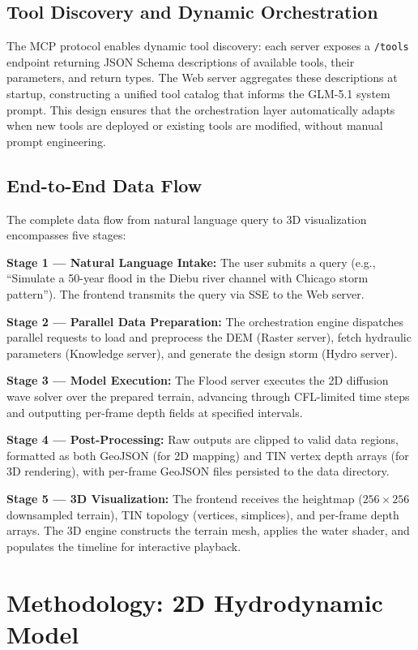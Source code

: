 \documentclass[11pt, a4paper]{article}
\begin{document}
\subsection{Tool Discovery and Dynamic Orchestration}

The MCP protocol enables dynamic tool discovery: each server exposes a \texttt{/tools} endpoint returning JSON Schema descriptions of available tools, their parameters, and return types. The Web server aggregates these descriptions at startup, constructing a unified tool catalog that informs the GLM-5.1 system prompt. This design ensures that the orchestration layer automatically adapts when new tools are deployed or existing tools are modified, without manual prompt engineering.

\subsection{End-to-End Data Flow}

The complete data flow from natural language query to 3D visualization encompasses five stages:

\textbf{Stage 1 --- Natural Language Intake:} The user submits a query (e.g., ``Simulate a 50-year flood in the Diebu river channel with Chicago storm pattern''). The frontend transmits the query via SSE to the Web server.

\textbf{Stage 2 --- Parallel Data Preparation:} The orchestration engine dispatches parallel requests to load and preprocess the DEM (Raster server), fetch hydraulic parameters (Knowledge server), and generate the design storm (Hydro server).

\textbf{Stage 3 --- Model Execution:} The Flood server executes the 2D diffusion wave solver over the prepared terrain, advancing through CFL-limited time steps and outputting per-frame depth fields at specified intervals.

\textbf{Stage 4 --- Post-Processing:} Raw outputs are clipped to valid data regions, formatted as both GeoJSON (for 2D mapping) and TIN vertex depth arrays (for 3D rendering), with per-frame GeoJSON files persisted to the data directory.

\textbf{Stage 5 --- 3D Visualization:} The frontend receives the heightmap ($256 \times 256$ downsampled terrain), TIN topology (vertices, simplices), and per-frame depth arrays. The 3D engine constructs the terrain mesh, applies the water shader, and populates the timeline for interactive playback.

\section{Methodology: 2D Hydrodynamic Model}
\label{sec:method}
\end{document}
